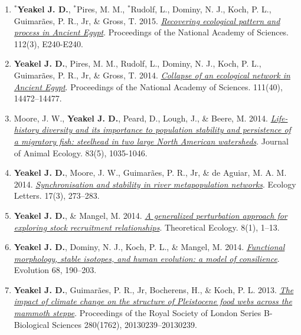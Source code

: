 \documentclass[margin,line,12pt]{res}
\begin{document}
\begin{resume}
\begin{enumerate}
\item \textbf{${}^\ast$Yeakel J. D.}, ${}^\ast$Pires, M. M., ${}^\ast$Rudolf, L., Dominy, N. J., Koch, P. L., Guimar\~aes, P. R., Jr,
\& Gross, T. 2015. \href{https://www.pnas.org/content/early/2015/01/07/1422646112}{\emph{Recovering ecological pattern and process in Ancient Egypt}}. Proceedings of the National Academy of Sciences. 112(3), E240-E240.

\item \textbf{Yeakel J. D.}, Pires, M. M., Rudolf, L., Dominy, N. J., Koch, P. L., Guimar\~aes, P. R., Jr, \& Gross, T. 2014. \href{https://www.pnas.org/content/111/40/14472}{\emph{Collapse of an ecological network in Ancient Egypt}}. Proceedings of the National Academy of Sciences. 111(40), 14472–14477.

\item Moore, J. W., \textbf{Yeakel J. D.}, Peard, D., Lough, J., \& Beere, M. 2014. \href{https://besjournals.onlinelibrary.wiley.com/doi/10.1111/1365-2656.12212}{\emph{Life-history diversity and its importance to population stability and persistence of a migratory fish: steelhead in two large North American watersheds}}. Journal of Animal Ecology. 83(5), 1035-1046.

\item \textbf{Yeakel J. D.}, Moore, J. W., Guimar\~aes, P. R., Jr, \& de Aguiar, M. A. M. 2014. \href{https://onlinelibrary.wiley.com/doi/abs/10.1111/ele.12228}{\emph{Synchronisation and stability in river metapopulation networks}}. Ecology Letters. 17(3), 273–283.

\item \textbf{Yeakel J. D.}, \& Mangel, M. 2014. \href{https://link.springer.com/article/10.1007/s12080-014-0230-z}{\emph{A generalized perturbation approach for exploring stock recruitment relationships}}. Theoretical Ecology. 8(1), 1–13.

\item \textbf{Yeakel J. D.}, Dominy, N. J., Koch, P. L., \& Mangel, M. 2014. \href{https://onlinelibrary.wiley.com/doi/full/10.1111/evo.12240}{\emph{Functional morphology, stable isotopes, and human evolution: a model of consilience}}. Evolution 68, 190–203.

\item \textbf{Yeakel J. D.}, Guimar\~aes, P. R., Jr, Bocherens, H., \& Koch, P. L. 2013. \href{https://royalsocietypublishing.org/doi/10.1098/rspb.2013.0239}{\emph{The impact of climate change on the structure of Pleistocene food webs across the mammoth steppe}}. Proceedings of the Royal Society of London Series B-Biological Sciences 280(1762), 20130239–20130239.


\end{enumerate}
\end{resume}
\end{document}
